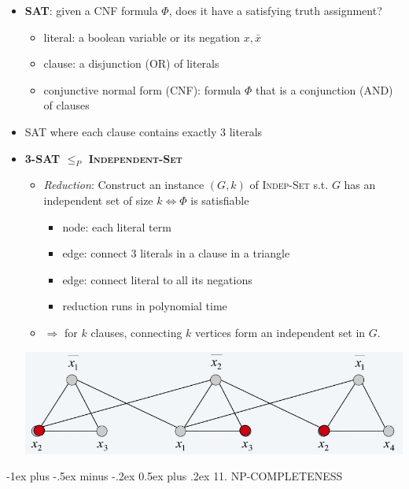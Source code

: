 \documentclass[10pt, landscape]{article}
\makeatletter
\renewcommand{\section}{\@startsection{section}{1}{0mm}%
  {-1ex plus -.5ex minus -.2ex}%
  {0.5ex plus .2ex}%
{\normalfont\large\bfseries}}
\makeatother
\begin{document}
\begin{multicols*}{4}
  \begin{itemize}
    \item \textbf{SAT}: given a CNF formula $\Phi$, does it have a satisfying truth assignment?
      \begin{itemize}
        \item literal: a boolean variable or its negation $x, \bar{x}$
        \item clause: a disjunction (OR) of literals
        \item conjunctive normal form (CNF): formula $\Phi$ that is a conjunction (AND) of clauses
      \end{itemize}
    \item {} SAT where each clause contains exactly $3$ literals
    \item \textbf{3-SAT $\leq_P$ \textsc{Independent-Set}}
      \begin{itemize}
        \item \textit{Reduction}: Construct an instance $(G, k)$ of \textsc{Indep-Set} s.t. $G$ has an independent set of size $k \iff \Phi$ is satisfiable
          \begin{itemize}
            \item node: each literal term
            \item edge: connect 3 literals in a clause in a triangle
            \item edge: connect literal to all its negations
            \item reduction runs in polynomial time
          \end{itemize}
        \item $\Rightarrow$ for $k$ clauses, connecting $k$ vertices form an independent set in $G$. 
      \end{itemize}
      \includegraphics[width=0.95\linewidth]{cs3230-3sat-indepset-reduction.png} 
  \end{itemize}

  \section{11. NP-COMPLETENESS}


\end{multicols*}
\end{document}
